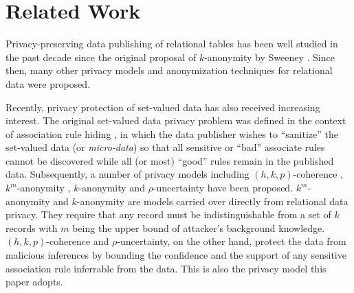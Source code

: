 \section{Related Work}
\label{sec:related}

Privacy-preserving data publishing of relational tables has been well
studied in the past decade since the original proposal of $k$-anonymity by
Sweeney \etal \cite{Sweeney2002:k-anonymity}.
Since then, many other privacy models and anonymization
techniques \cite{Kifer:l-diversity, Bayardo:optimal-k-anonymity,
Fung:2005:TopdownSpe, LeFevre:2005:Incognito, LeFevre:2006:Mondrian,
Wong:2010:NGP} for relational data were proposed.

Recently, privacy protection of set-valued data has also received increasing
interest. The original set-valued data privacy problem was defined in the
context of association rule hiding \cite{atallah99:disclosure,
tkde:VerykiosEBSD04:ARH, tkde:WuCC07:hiding}, in which the data publisher
wishes to ``sanitize'' the set-valued data (or {\em micro-data}) so that all
sensitive or ``bad'' associate rules cannot be discovered while all (or most)
``good'' rules remain in the published data.
Subsequently, a number of privacy models
including $(h,k,p)$-coherence \cite{Xu:2008:ATD},
$k^m$-anonymity \cite{Terrovitis:2008:PAS},
$k$-anonymity \cite{He:2009:ASD} and
$\rho$-uncertainty \cite{Cao:2010:rho} have been proposed.
$k^m$-anonymity and $k$-anonymity are models carried over directly from
relational data privacy. They require that any record must be
indistinguishable from a set of $k$ records
with $m$ being the upper bound of attacker's background knowledge.
$(h,k,p)$-coherence and $\rho$-uncertainty, on the other hand, protect the
data from malicious inferences by bounding the confidence and the support of
any sensitive association rule inferrable from the data. This is
also the privacy model this paper adopts.

